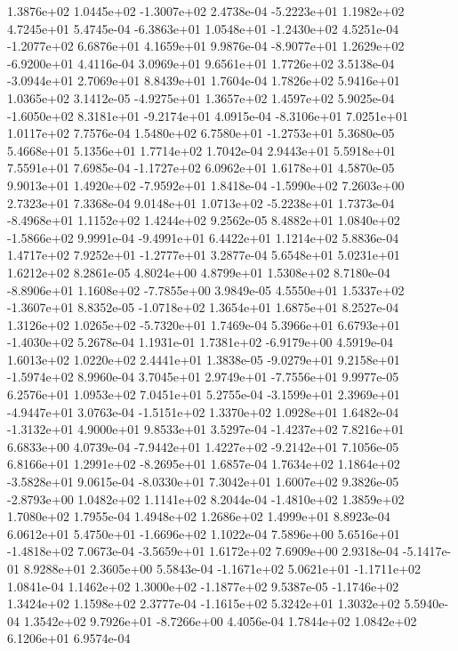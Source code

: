  1.3876e+02  1.0445e+02 -1.3007e+02  2.4738e-04
-5.2223e+01  1.1982e+02  4.7245e+01  5.4745e-04
-6.3863e+01  1.0548e+01 -1.2430e+02  4.5251e-04
-1.2077e+02  6.6876e+01  4.1659e+01  9.9876e-04
-8.9077e+01  1.2629e+02 -6.9200e+01  4.4116e-04
3.0969e+01 9.6561e+01 1.7726e+02  3.5138e-04
-3.0944e+01  2.7069e+01  8.8439e+01  1.7604e-04
1.7826e+02 5.9416e+01 1.0365e+02  3.1412e-05
-4.9275e+01  1.3657e+02  1.4597e+02  5.9025e-04
-1.6050e+02  8.3181e+01 -9.2174e+01  4.0915e-04
-8.3106e+01  7.0251e+01  1.0117e+02  7.7576e-04
 1.5480e+02  6.7580e+01 -1.2753e+01  5.3680e-05
5.4668e+01 5.1356e+01 1.7714e+02  1.7042e-04
2.9443e+01 5.5918e+01 7.5591e+01  7.6985e-04
-1.1727e+02  6.0962e+01  1.6178e+01  4.5870e-05
 9.9013e+01  1.4920e+02 -7.9592e+01  1.8418e-04
-1.5990e+02  7.2603e+00  2.7323e+01  7.3368e-04
 9.0148e+01  1.0713e+02 -5.2238e+01  1.7373e-04
-8.4968e+01  1.1152e+02  1.4244e+02  9.2562e-05
 8.4882e+01  1.0840e+02 -1.5866e+02  9.9991e-04
-9.4991e+01  6.4422e+01  1.1214e+02  5.8836e-04
 1.4717e+02  7.9252e+01 -1.2777e+01  3.2877e-04
5.6548e+01 5.0231e+01 1.6212e+02  8.2861e-05
4.8024e+00 4.8799e+01 1.5308e+02  8.7180e-04
-8.8906e+01  1.1608e+02 -7.7855e+00  3.9849e-05
 4.5550e+01  1.5337e+02 -1.3607e+01  8.8352e-05
-1.0718e+02  1.3654e+01  1.6875e+01  8.2527e-04
 1.3126e+02  1.0265e+02 -5.7320e+01  1.7469e-04
 5.3966e+01  6.6793e+01 -1.4030e+02  5.2678e-04
 1.1931e-01  1.7381e+02 -6.9179e+00  4.5919e-04
1.6013e+02 1.0220e+02 2.4441e+01  1.3838e-05
-9.0279e+01  9.2158e+01 -1.5974e+02  8.9960e-04
 3.7045e+01  2.9749e+01 -7.7556e+01  9.9977e-05
6.2576e+01 1.0953e+02 7.0451e+01  5.2755e-04
-3.1599e+01  2.3969e+01 -4.9447e+01  3.0763e-04
-1.5151e+02  1.3370e+02  1.0928e+01  1.6482e-04
-1.3132e+01  4.9000e+01  9.8533e+01  3.5297e-04
-1.4237e+02  7.8216e+01  6.6833e+00  4.0739e-04
-7.9442e+01  1.4227e+02 -9.2142e+01  7.1056e-05
 6.8166e+01  1.2991e+02 -8.2695e+01  1.6857e-04
 1.7634e+02  1.1864e+02 -3.5828e+01  9.0615e-04
-8.0330e+01  7.3042e+01  1.6007e+02  9.3826e-05
-2.8793e+00  1.0482e+02  1.1141e+02  8.2044e-04
-1.4810e+02  1.3859e+02  1.7080e+02  1.7955e-04
1.4948e+02 1.2686e+02 1.4999e+01  8.8923e-04
 6.0612e+01  5.4750e+01 -1.6696e+02  1.1022e-04
 7.5896e+00  5.6516e+01 -1.4818e+02  7.0673e-04
-3.5659e+01  1.6172e+02  7.6909e+00  2.9318e-04
-5.1417e-01  8.9288e+01  2.3605e+00  5.5843e-04
-1.1671e+02  5.0621e+01 -1.1711e+02  1.0841e-04
 1.1462e+02  1.3000e+02 -1.1877e+02  9.5387e-05
-1.1746e+02  1.3424e+02  1.1598e+02  2.3777e-04
-1.1615e+02  5.3242e+01  1.3032e+02  5.5940e-04
 1.3542e+02  9.7926e+01 -8.7266e+00  4.4056e-04
1.7844e+02 1.0842e+02 6.1206e+01  6.9574e-04
